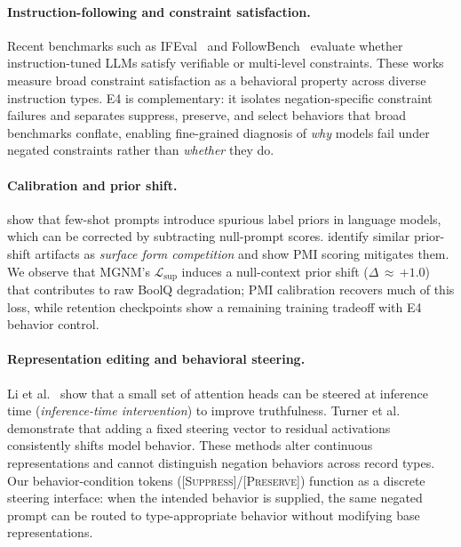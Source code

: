 \documentclass[letterpaper]{article}
\begin{document}
\paragraph{Instruction-following and constraint satisfaction.}
Recent benchmarks such as IFEval~\cite{zhou2023ifeval} and
FollowBench~\cite{jiang2023followbench} evaluate whether instruction-tuned
LLMs satisfy verifiable or multi-level constraints.
These works measure broad constraint satisfaction as a behavioral property
across diverse instruction types.
E4 is complementary: it isolates negation-specific constraint failures
and separates suppress, preserve, and select behaviors that broad benchmarks
conflate, enabling fine-grained diagnosis of \emph{why} models fail under
negated constraints rather than \emph{whether} they do.

\paragraph{Calibration and prior shift.}
\citet{zhao2021calibrate} show that few-shot prompts introduce spurious label
priors in language models, which can be corrected by subtracting null-prompt scores.
\citet{holtzman2021surface} identify similar prior-shift artifacts as
\emph{surface form competition} and show PMI scoring mitigates them.
We observe that MGNM's $\mathcal{L}_\text{sup}$ induces a null-context prior shift
($\Delta\,{\approx}\,{+1.0}$) that contributes to raw BoolQ degradation; PMI
calibration recovers much of this loss, while retention checkpoints show a
remaining training tradeoff with E4 behavior control.

\paragraph{Representation editing and behavioral steering.}
Li et al.~\cite{li2023inference} show that a small set of attention heads
can be steered at inference time (\emph{inference-time intervention}) to improve
truthfulness.  Turner et al.~\cite{turner2023activation} demonstrate that
adding a fixed steering vector to residual activations consistently shifts model
behavior.  These methods alter continuous representations and cannot distinguish
negation behaviors across record types.  Our behavior-condition tokens
(\textsc{[Suppress]}/\textsc{[Preserve]}) function as a discrete steering
interface: when the intended behavior is supplied, the same negated prompt can
be routed to type-appropriate behavior without modifying base representations.
\end{document}
